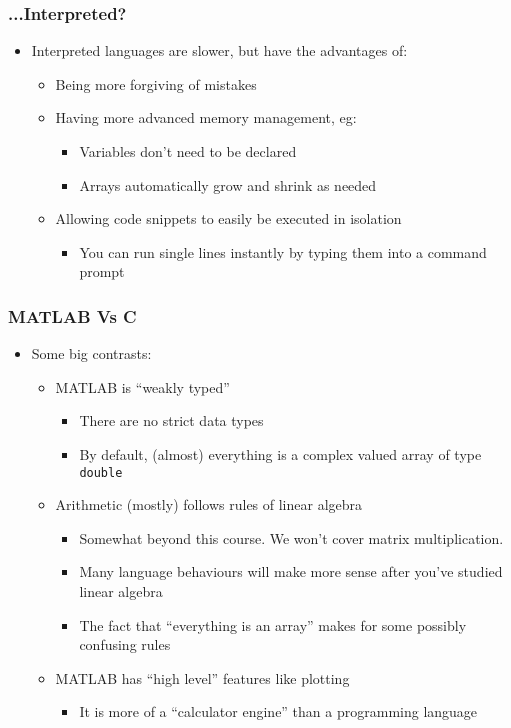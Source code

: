 \documentclass[14pt]{beamer}
\begin{document}
\begin{frame}
\frametitle{...Interpreted?}
\begin{itemize}
\item Interpreted languages are slower, but have the advantages of:
	\begin{itemize}
		\item Being more forgiving of mistakes
		\item Having more advanced memory management, eg:
			\begin{itemize}
				\item Variables don't need to be declared
				\item Arrays automatically grow and shrink as needed
			\end{itemize}
		\item Allowing code snippets to easily be executed in isolation
			\begin{itemize}
				\item You can run single lines instantly by typing them into a command prompt
			\end{itemize}
	\end{itemize}
\end{itemize}
\end{frame}

\begin{frame}
\frametitle{MATLAB Vs C}
\begin{itemize}
\item Some big contrasts:
	\begin{itemize}
		\item MATLAB is ``weakly typed''
			\begin{itemize}
				\item There are no strict data types
				\item By default, (almost) everything is a complex valued array of type \texttt{double}
			\end{itemize}
		\item Arithmetic (mostly) follows rules of linear algebra
			\begin{itemize}
				\item Somewhat beyond this course. We won't cover matrix multiplication.
				\item Many language behaviours will make more sense after you've studied linear algebra
				\item The fact that ``everything is an array'' makes for some possibly confusing rules
			\end{itemize}
		\item MATLAB has ``high level'' features like plotting
			\begin{itemize}
				\item It is more of a ``calculator engine'' than a programming language
			\end{itemize}
	\end{itemize}
\end{itemize}
\end{frame}
\end{document}
